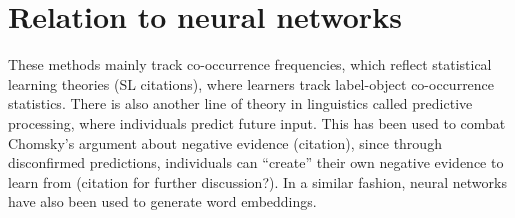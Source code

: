 
\section{Relation to neural networks}



These methods mainly track co-occurrence frequencies, which reflect statistical learning theories (SL citations), where learners track label-object co-occurrence statistics. There is also another line of theory in linguistics called predictive processing, where individuals predict future input. This has been used to combat Chomsky's argument about negative evidence (citation), since through disconfirmed predictions, individuals can ``create'' their own negative evidence to learn from (citation for further discussion?). In a similar fashion, neural networks have also been used to generate word embeddings.



